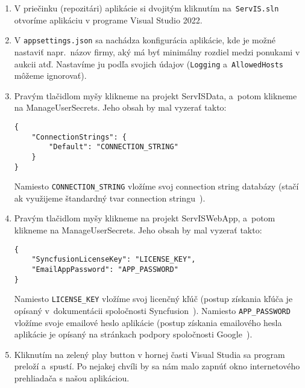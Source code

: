 \begin{enumerate}
  \item V priečinku (repozitári) aplikácie si dvojitým kliknutím na~\verb|ServIS.sln| otvoríme aplikáciu v programe Visual Studio 2022.
  \item V \verb|appsettings.json| sa nachádza konfigurácia aplikácie, kde je možné nastaviť napr.~názov firmy, aký má byť minimálny rozdiel medzi ponukami v aukcii atď. Nastavíme ju podľa svojich údajov (\verb|Logging| a~\verb|AllowedHosts| môžeme ignorovať).
  \item Pravým tlačidlom myšy klikneme na projekt ServISData, a~potom klikneme na ManageUserSecrets. Jeho obsah by mal vyzerať takto:
  
\begin{verbatim}
{
	"ConnectionStrings": {
        "Default": "CONNECTION_STRING"
    }
}
\end{verbatim}  
  
Namiesto \verb|CONNECTION_STRING| vložíme svoj connection string databázy (stačí ak využijeme štandardný tvar connection stringu~\cite{standard connection string}).

  \item Pravým tlačidlom myšy klikneme na projekt ServISWebApp, a~potom klikneme na ManageUserSecrets. Jeho obsah by mal vyzerať takto:
  
\begin{verbatim}
{
    "SyncfusionLicenseKey": "LICENSE_KEY",
    "EmailAppPassword": "APP_PASSWORD"
}
\end{verbatim}  
  
Namiesto \verb|LICENSE_KEY| vložíme svoj licenčný kľúč (postup získania kľúča je opísaný v~dokumentácii spoločnosti Syncfusion~\cite{license key}). Namiesto \verb|APP_PASSWORD| vložíme svoje emailové heslo aplikácie (postup získania emailového hesla aplikácie je opísaný na stránkach podpory spoločnosti Google~\cite{app password}).
  
  \item Kliknutím na zelený play button v hornej časti Visual Studia sa program preloží a~spustí. Po nejakej chvíli by sa nám malo zapnúť okno internetového prehliadača s našou aplikáciou.
\end{enumerate}
